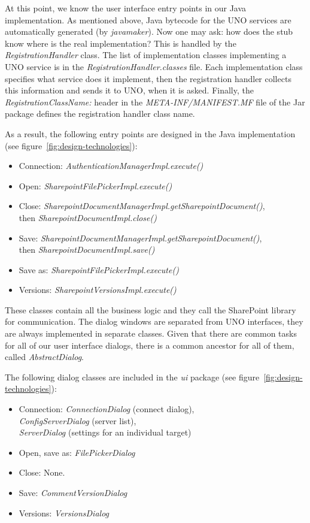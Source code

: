 At this point, we know the user interface entry points in our Java
implementation. As mentioned above, Java bytecode for the UNO services are
automatically generated (by \emph{javamaker}). Now one may ask: how does the
stub know where is the real implementation? This is handled by the
\emph{RegistrationHandler} class. The list of implementation classes
implementing a UNO service is in the \emph{RegistrationHandler.classes} file.
Each implementation class specifies what service does it implement, then the
registration handler collects this information and sends it to UNO, when it is
asked. Finally, the \emph{RegistrationClassName:} header in the
\emph{META-INF/MANIFEST.MF} file of the Jar package defines the registration
handler class name.

As a result, the following entry points are designed in the Java
implementation (see figure~\ref{fig:design-technologies}):

\begin{itemize}
\item Connection: \emph{AuthenticationManagerImpl.execute()}
\item Open: \emph{SharepointFilePickerImpl.execute()}
\item Close: \emph{SharepointDocumentManagerImpl.getSharepointDocument()}, \\ then \emph{SharepointDocumentImpl.close()}
\item Save: \emph{SharepointDocumentManagerImpl.getSharepointDocument()}, \\ then \emph{SharepointDocumentImpl.save()}
\item Save as: \emph{SharepointFilePickerImpl.execute()}
\item Versions: \emph{SharepointVersionsImpl.execute()}
\end{itemize}

These classes contain all the business logic and they call the SharePoint
library for communication. The dialog windows are separated from UNO
interfaces, they are always implemented in separate classes. Given that there
are common tasks for all of our user interface dialogs, there is a common
ancestor for all of them, called \emph{AbstractDialog}.

The following dialog classes are included in the \emph{ui} package (see figure~\ref{fig:design-technologies}):

\begin{itemize}
\item Connection: \emph{ConnectionDialog} (connect dialog), \\
\emph{ConfigServerDialog} (server list), \\ \emph{ServerDialog} (settings for an
individual target)
\item Open, save as: \emph{FilePickerDialog}
\item Close: None.
\item Save: \emph{CommentVersionDialog}
\item Versions: \emph{VersionsDialog}
\end{itemize}

